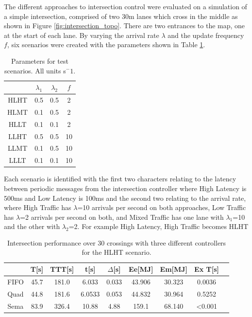 The different approaches to intersection control were evaluated on a simulation of a simple intersection, comprised of two 30m lanes which cross in the middle as shown in Figure \ref{fig:intersection_topo}. There are two entrances to the map, one at the start of each lane. By varying the arrival rate $\lambda$ and the update frequency $f$, six scenarios were created with the parameters shown in Table \ref{tab:params}.
\begin{table}
\begin{tabular}{|c|c|c|c|}
\hline
	& $\lambda_1$ & $\lambda_2$ & $f$ \\
\hline
HLHT & 0.5 & 0.5 & 2 \\
HLMT & 0.1 & 0.5 & 2 \\
HLLT & 0.1 & 0.1 & 2 \\
LLHT & 0.5 & 0.5 & 10 \\
LLMT & 0.1 & 0.5 & 10 \\
LLLT & 0.1 & 0.1 & 10 \\
\hline
\end{tabular}
\label{tab:params}
\caption{Parameters for test scenarios. All units s$^-1$. }
\end{table}

Each scenario is identified with the first two characters relating to the latency between periodic messages from the intersection controller where High Latency is 500ms and  Low Latency is 100ms and the second two relating to the arrival rate, where High Traffic has $\lambda$=10 arrivals per second on both approaches, Low Traffic has $\lambda$=2 arrivals per second on both, and Mixed Traffic has one lane with $\lambda_1$=10 and the other with $\lambda_2$=2. For example High Latency, High Traffic becomes HLHT

\begin{table}
\begin{tabular}{|c|c|c|c|c|c|c|c|c|}
\hline
& T[s]&TTT[s]&t[s]&$\Delta$[s]&Ee[MJ]&Em[MJ]&Ex T[s]\\
\hline
FIFO & 45.7 & 181.0 & 6.033 & 0.033 & 43.906 & 30.323 & 0.0036\\
Quad & 44.8 &181.6& 6.0533 & 0.053 & 44.832 & 30.964 & 0.5252\\
Sema & 83.9 & 326.4 & 10.88 & 4.88 & 159.1 & 68.140 & <0.001\\
\hline
\end{tabular}
\label{tab:results}
\caption{Intersection performance over 30 crossings with three different controllers for the HLHT scenario. }
\end{table}

